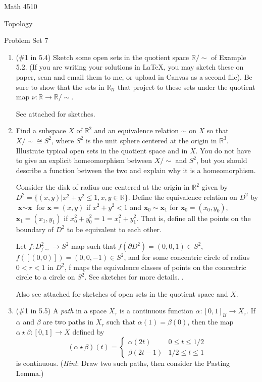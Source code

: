 \documentclass[12pt]{article}
\begin{document}
\noindent Math 4510

\noindent Topology

\vspace{.2in}
\begin{center}
Problem Set 7
\end{center}

 \begin{enumerate}%
\item (\#1 in 5.4) Sketch some open sets in the quotient space $\mathbb{R}/\sim$ of Example 5.2. (If you are writing your solutions in LaTeX, you may sketch these on paper, scan and email them to me, or upload in Canvas as a second file). Be sure to show that the sets in $\mathbb{R}_{\mathcal{U}}$ that project to these sets under the quotient map $\nu: \mathbb{R}\to \mathbb{R}/\sim$.

See attached for sketches.

\item Find a subspace $X$ of $\mathbb{R}^2$ and an equivalence relation $\sim$ on $X$ so that $X/\sim\cong S^2$, where $S^2$ is the unit sphere centered at the origin in $\mathbb{R}^3$. Illustrate typical open sets in the quotient space and in $X$. You do not have to give an explicit homeomorphism between $X/\sim$ and $S^2$, but you should describe a function between the two and explain why it is a homeomorphism.

Consider the disk of radius one centered at the origin in $\mathbb{R}^2$ given by $D^2 = \{(x,y) | x^2 + y^2 \leq 1, x,y \in \mathbb{R}\}$. Define the equivalence relation on $D^2$ by $\textbf{x} \sim \textbf{x}$ for $\textbf{x} = (x,y)$ if $x ^2 + y^2 < 1$ and $\textbf{x}_0 \sim \textbf{x}_1$ for $\textbf{x}_0 = (x_0, y_0)$, $\textbf{x}_1 = (x_1, y_1)$ if $x_0^2 + y_0^2 = 1 = x_1^2 + y_1^2$. That is, define all the points on the boundary of $D^2$ to be equivalent to each other. 

Let $f: D^2_{/\sim} \to S^2$ map such that $f(\partial D^2) = (0,0,1) \in S^2$, $f([(0,0)]) = (0,0,-1) \in S^2$, and for some concentric circle of radius $0 < r < 1$ in $D^2$, f maps the equivalence classes of points on the concentric circle to a circle on $S^2$. See sketches for more details.
.

Also see attached for sketches of open sets in the quotient space and $X$.

\item (\#1 in 5.5) A \textit{path} in a space $X_{\tau}$ is a continuous function $\alpha:[0,1]_{\mathcal{U}}\to X_{\tau}$. If $\alpha$ and $\beta$ are two paths in $X_{\tau}$ such that $\alpha(1) = \beta(0)$, then the map $\alpha \star \beta:[0,1]\to X$ defined by 
\[(\alpha \star \beta)(t)=\left\{ \begin{array}{ll}
                  \alpha(2t) & \mbox{$0\leq t\leq 1/2$}\\
                  \beta(2t-1)      & \mbox{$1/2 \leq t\leq 1$}
                  \end{array}
          \right. \]
 is continuous. (\textit{Hint}: Draw two such paths, then consider the Pasting Lemma.)
 

\end{enumerate}
\end{document}

